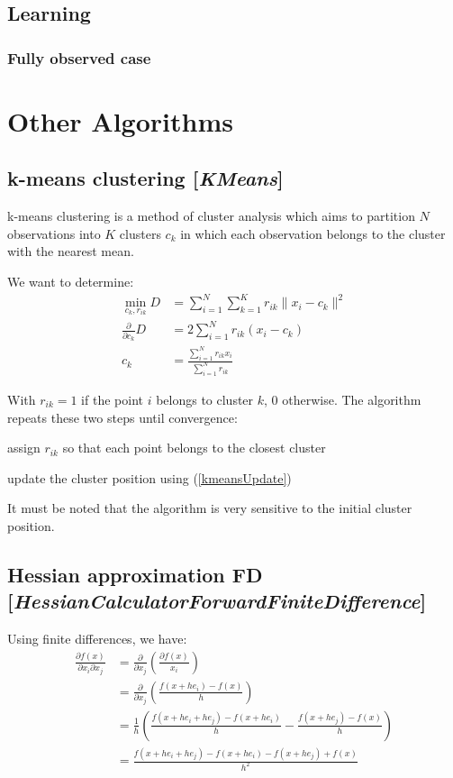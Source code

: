 \documentclass[11pt]{article}
\newcommand{\nllref}[1]{[\small{\textit{#1}}]}
\newcommand{\norm}[1]{\| #1 \|}
\begin{document}
\subsection{Learning}
\subsubsection{Fully observed case}

\section{Other Algorithms}
\subsection{k-means clustering \nllref{KMeans}}
k-means clustering is a method of cluster analysis which aims to partition $N$ observations into $K$ clusters $c_k$ in which each observation belongs to the cluster with the nearest mean.

We want to determine:
\begin{align}
\min_{c_k,r_{ik}} D &= \sum_{i=1}^N\sum_{k=1}^K r_{ik} \norm{x_i-c_k}^2\nonumber\\
\frac{\partial}{\partial c_k}D &= 2 \sum_{i=1}^Nr_{ik}(x_i-c_k) \nonumber\\
c_k &= \frac{\sum_{i=1}^N r_{ik}x_i}{\sum_{i=1}^N r_{ik}} \label{kmeansUpdate}
\end{align}

With $r_{ik}=1$ if the point $i$ belongs to cluster $k$, 0 otherwise. The algorithm repeats these two steps until convergence:
\begin{compactitem}
\item assign $r_{ik}$ so that each point belongs to the closest cluster
\item update the cluster position using (\ref{kmeansUpdate})
\end{compactitem}
It must be noted that the algorithm is very sensitive to the initial cluster position.
\subsection{Hessian approximation FD \nllref{HessianCalculatorForwardFiniteDifference}}
Using finite differences, we have:
\begin{align}
\frac{\partial f(x)}{\partial x_i \partial x_j} &= \frac{\partial}{\partial x_j}( \frac{\partial f(x)}{x_i}) \nonumber\\
&= \frac{\partial}{\partial x_j}( \frac{f(x + he_i) - f(x)}{h} ) \nonumber\\
&= \frac{1}{h}( \frac{f(x + he_i + he_j) - f(x + he_i)}{h} - \frac{f(x + he_j) - f(x)}{h} ) \nonumber\\
&= \frac{f(x + he_i + he_j) - f(x + he_i)-f(x + he_j)+f(x)}{h^2}
\end{align}
\end{document}
